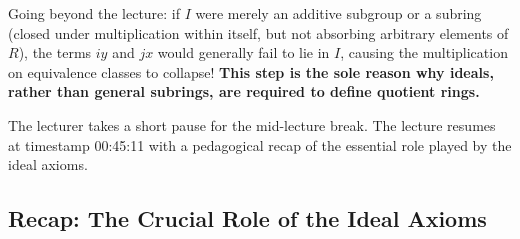 \begin{content}
\begin{steps}
Going beyond the lecture: if $I$ were merely an additive subgroup or a subring (closed under multiplication within itself, but not absorbing arbitrary elements of $R$), the terms $i y$ and $j x$ would generally fail to lie in $I$, causing the multiplication on equivalence classes to collapse! \textbf{This step is the sole reason why ideals, rather than general subrings, are required to define quotient rings.}
\end{steps}
\end{content}

\begin{hidden}
\end{hidden}

\begin{pause}
The lecturer takes a short pause for the mid-lecture break. The lecture resumes at timestamp 00:45:11 with a pedagogical recap of the essential role played by the ideal axioms.
\end{pause}

\subsection{Recap: The Crucial Role of the Ideal Axioms}

